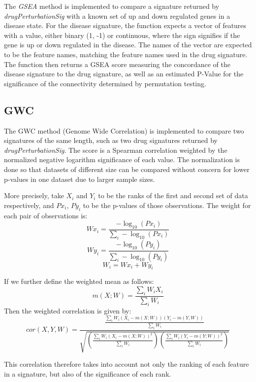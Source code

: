 \documentclass[11pt]{article}
\begin{document}
The \textit{GSEA} method is implemented to compare a signature returned by \textit{drugPerturbationSig} with a known set of up and down regulated genes in a disease state. For the disease signature, the function expects a vector of features with a value, either binary (1, -1) or continuous, where the sign signifies if the gene is up or down regulated in the disease. The names of the vector are expected to be the feature names, matching the feature names used in the drug signature. The function then returns a GSEA score measuring the concordance of the disease signature to the drug signature, as well as an estimated P-Value for the significance of the connectivity determined by permutation testing. 

\subsection{GWC}

The GWC method (Genome Wide Correlation) is implemented to compare two signatures of the same length, such as two drug signatures returned by \textit{drugPerturbationSig}. The score is a Spearman correlation weighted by the normalized negative logarithm significance of each value. The normalization is done so that datasets of different size can be compared without concern for lower p-values in one dataset due to larger sample sizes. 

More precisely, take $X_i$ and $Y_i$ to be the ranks of the first and second set of data respectively, and $Px_i$, $Py_i$ to be the p-values of those observations. The weight for each pair of observations is:
$$Wx_i = \frac{-\log_{10}(Px_i)}{\sum_{i}-\log_{10}(Px_i)}$$
$$Wy_i = \frac{-\log_{10}(Py_i)}{\sum_{i}-\log_{10}(Py_i)}$$
$$W_i = Wx_i + Wy_i$$

If we further define the weighted mean as follows:
$$ m(X;W) = \frac{\sum_i W_i X_i}{\sum_i{W_i}}$$
Then the weighted correlation is given by:
$$ cor(X,Y,W) = \frac{\frac{\sum_i W_i (X_i - m(X;W))(Y_i - m(Y,W))}{\sum_i W_i}}{\sqrt{(\frac{\sum_i W_i (X_i - m(X;W))^2}{\sum_i W_i})(\frac{\sum_i W_i (Y_i - m(Y;W))^2}{\sum_i W_i})}}$$

This correlation therefore takes into account not only the ranking of each feature in a signature, but also of the significance of each rank.

\end{document}

